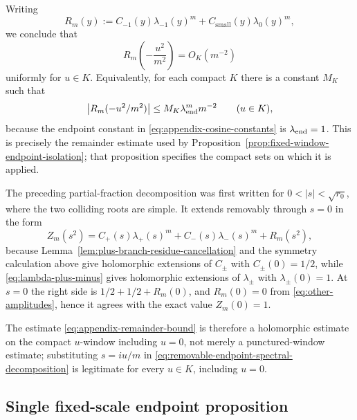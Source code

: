Writing
\[
R_m(y):=
C_{-1}(y)\lambda_{-1}(y)^m+C_{\mathrm{small}}(y)\lambda_0(y)^m,
\]
we conclude that
\begin{equation}\label{eq:appendix-remainder-bound}
R_m\!\left(-\frac{u^2}{m^2}\right)=O_K(m^{-2})
\end{equation}
uniformly for \(u\in K\).
Equivalently, for each compact \(K\) there is a constant \(M_K\) such that
\[
\left\lvert R_m(-u^2/m^2)\right\rvert\le M_K\lambda_{\mathrm{end}}^m m^{-2}
\qquad (u\in K),
\]
because the endpoint constant in \eqref{eq:appendix-cosine-constants} is \(\lambda_{\mathrm{end}}=1\).
This is precisely the remainder estimate used by Proposition~\ref{prop:fixed-window-endpoint-isolation}; that proposition specifies the compact sets on which it is applied.

The preceding partial-fraction decomposition was first written for $0<|s|<\sqrt{r_0}$, where the two colliding roots are simple.  It extends removably through $s=0$ in the form
\begin{equation}\label{eq:removable-endpoint-spectral-decomposition}
Z_m(s^2)=C_+(s)\lambda_+(s)^m+C_-(s)\lambda_-(s)^m+R_m(s^2),
\end{equation}
because Lemma~\ref{lem:plus-branch-residue-cancellation} and the symmetry calculation above give holomorphic extensions of $C_\pm$ with $C_\pm(0)=1/2$, while \eqref{eq:lambda-plus-minus} gives holomorphic extensions of $\lambda_\pm$ with $\lambda_\pm(0)=1$.  At $s=0$ the right side is $1/2+1/2+R_m(0)$, and $R_m(0)=0$ from \eqref{eq:other-amplitudes}, hence it agrees with the exact value $Z_m(0)=1$.

The estimate \eqref{eq:appendix-remainder-bound} is therefore a holomorphic estimate on the compact $u$-window including $u=0$, not merely a punctured-window estimate; substituting $s=iu/m$ in \eqref{eq:removable-endpoint-spectral-decomposition} is legitimate for every $u\in K$, including $u=0$.

\subsection{Single fixed-scale endpoint proposition}

